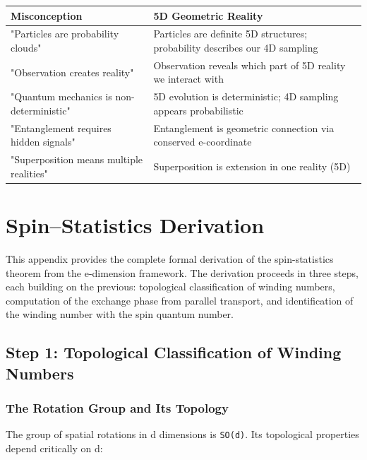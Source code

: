 \documentclass[aps,prd,preprint,superscriptaddress,longbibliography,floatfix]{revtex4-2}
\theoremstyle{remark}
\begin{document}
\begin{table}[H]
\begin{ruledtabular}
\begin{tabular}{p{7.5cm}p{7.5cm}}
Misconception & 5D Geometric Reality \\
\hline
"Particles are probability clouds" & Particles are definite 5D structures; probability describes our 4D sampling \\
"Observation creates reality" & Observation reveals which part of 5D reality we interact with \\
"Quantum mechanics is non-deterministic" & 5D evolution is deterministic; 4D sampling appears probabilistic \\
"Entanglement requires hidden signals" & Entanglement is geometric connection via conserved e-coordinate \\
"Superposition means multiple realities" & Superposition is extension in one reality (5D) \\
\end{tabular}
\end{ruledtabular}
\end{table}


\section{Spin--Statistics Derivation}

This appendix provides the complete formal derivation of the spin-statistics theorem from the e-dimension framework. The derivation proceeds in three steps, each building on the previous: topological classification of winding numbers, computation of the exchange phase from parallel transport, and identification of the winding number with the spin quantum number.



\subsection{Step 1: Topological Classification of Winding Numbers}


\subsubsection{The Rotation Group and Its Topology}

The group of spatial rotations in d dimensions is \texttt{SO(d)}. Its topological properties depend critically on d:
\end{document}
